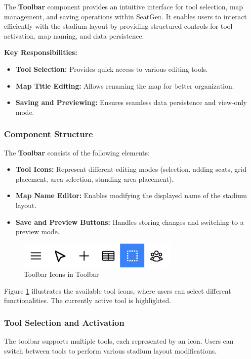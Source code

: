 The \textbf{Toolbar} component provides an intuitive interface for tool selection, map management, and saving operations within SeatGen. It enables users to interact efficiently with the stadium layout by providing structured controls for tool activation, map naming, and data persistence.

\textbf{Key Responsibilities:}
\begin{itemize}
    \item \textbf{Tool Selection:} Provides quick access to various editing tools.
    \item \textbf{Map Title Editing:} Allows renaming the map for better organization.
    \item \textbf{Saving and Previewing:} Ensures seamless data persistence and view-only mode.
\end{itemize}

\subsubsection{Component Structure}
The \textbf{Toolbar} consists of the following elements:
\begin{itemize}
    \item \textbf{Tool Icons:} Represent different editing modes (selection, adding seats, grid placement, area selection, standing area placement).
    \item \textbf{Map Name Editor:} Enables modifying the displayed name of the stadium layout.
    \item \textbf{Save and Preview Buttons:} Handles storing changes and switching to a preview mode.
\end{itemize}

\begin{figure}[H]
    \centering
    \includegraphics[width=0.7\textwidth]{pics/toolbar01.png}
    \caption{Toolbar Icons in Toolbar}
    \label{fig:toolbar-icons}
\end{figure}

Figure \ref{fig:toolbar-icons} illustrates the available tool icons, where users can select different functionalities. The currently active tool is highlighted.

\subsubsection{Tool Selection and Activation}
The toolbar supports multiple tools, each represented by an icon. Users can switch between tools to perform various stadium layout modifications.

